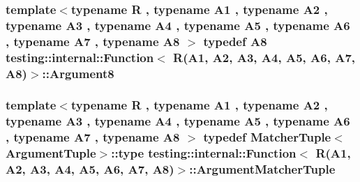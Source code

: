 \subsubsection[{\texorpdfstring{Argument8}{Argument8}}]{\setlength{\rightskip}{0pt plus 5cm}template$<$typename R , typename A1 , typename A2 , typename A3 , typename A4 , typename A5 , typename A6 , typename A7 , typename A8 $>$ typedef A8 {\bf testing\+::internal\+::\+Function}$<$ R(A1, A2, A3, A4, A5, A6, A7, A8)$>$\+::{\bf Argument8}}\hypertarget{structtesting_1_1internal_1_1Function_3_01R_07A1_00_01A2_00_01A3_00_01A4_00_01A5_00_01A6_00_01A7_00_01A8_08_4_a040234496283b1d0f5f508ac770107f6}{}\label{structtesting_1_1internal_1_1Function_3_01R_07A1_00_01A2_00_01A3_00_01A4_00_01A5_00_01A6_00_01A7_00_01A8_08_4_a040234496283b1d0f5f508ac770107f6}
\subsubsection[{\texorpdfstring{Argument\+Matcher\+Tuple}{ArgumentMatcherTuple}}]{\setlength{\rightskip}{0pt plus 5cm}template$<$typename R , typename A1 , typename A2 , typename A3 , typename A4 , typename A5 , typename A6 , typename A7 , typename A8 $>$ typedef {\bf Matcher\+Tuple}$<${\bf Argument\+Tuple}$>$\+::type {\bf testing\+::internal\+::\+Function}$<$ R(A1, A2, A3, A4, A5, A6, A7, A8)$>$\+::{\bf Argument\+Matcher\+Tuple}}\hypertarget{structtesting_1_1internal_1_1Function_3_01R_07A1_00_01A2_00_01A3_00_01A4_00_01A5_00_01A6_00_01A7_00_01A8_08_4_a17a23c6751d1493e1069d535e28bcab2}{}\label{structtesting_1_1internal_1_1Function_3_01R_07A1_00_01A2_00_01A3_00_01A4_00_01A5_00_01A6_00_01A7_00_01A8_08_4_a17a23c6751d1493e1069d535e28bcab2}
